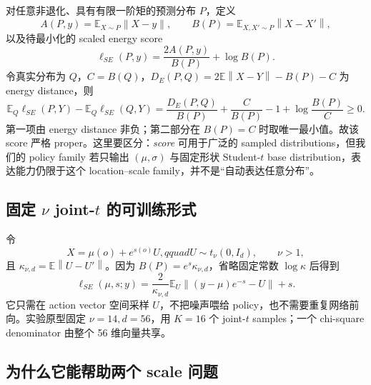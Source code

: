 \documentclass[10pt]{article}
\newcommand{\E}{\mathbb{E}}
\newcommand{\norm}[1]{\left\lVert#1\right\rVert}
\begin{document}
对任意非退化、具有有限一阶矩的预测分布 $P$，定义
\begin{equation}
 A(P,y)=\E_{X\sim P}\norm{X-y},\qquad
 B(P)=\E_{X,X'\sim P}\norm{X-X'},
\end{equation}
以及待最小化的 scaled energy score
\begin{equation}
 \ell_{SE}(P,y)=\frac{2A(P,y)}{B(P)}+\log B(P).
 \label{eq:scaled-energy-general}
\end{equation}
令真实分布为 $Q$，$C=B(Q)$，$D_E(P,Q)=2\E\norm{X-Y}-B(P)-C$ 为 energy distance，则
\begin{equation}
 \E_Q\ell_{SE}(P,Y)-\E_Q\ell_{SE}(Q,Y)
 =\frac{D_E(P,Q)}{B(P)}+\frac{C}{B(P)}-1+\log\frac{B(P)}{C}\ge0.
 \label{eq:propriety}
\end{equation}
第一项由 energy distance 非负；第二部分在 $B(P)=C$ 时取唯一最小值。故该 score 严格 proper。这里要区分：\emph{score} 可用于广泛的 sampled distributions，但我们的 policy family 若只输出 $(\mu,\sigma)$ 与固定形状 Student-$t$ base distribution，表达能力仍限于这个 location--scale family，并不是“自动表达任意分布”。

\subsection{固定 $\nu$ joint-$t$ 的可训练形式}

令
\begin{equation}
 X=\mu(o)+e^{s(o)}U,qquad U\sim t_\nu(0,I_d),\qquad \nu>1,
\end{equation}
且 $\kappa_{\nu,d}=\E\norm{U-U'}$。因为 $B(P)=e^s\kappa_{\nu,d}$，省略固定常数 $\log\kappa$ 后得到
\begin{equation}
 \ell_{SE}(\mu,s;y)
 =\frac{2}{\kappa_{\nu,d}}\E_U
 \left\| (y-\mu)e^{-s}-U\right\|+s.
 \label{eq:scaled-energy-t}
\end{equation}
它只需在 action vector 空间采样 $U$，不把噪声喂给 policy，也不需要重复网络前向。实验原型固定 $\nu=14,d=56$，用 $K=16$ 个 joint-$t$ samples；一个 chi-square denominator 由整个 56 维向量共享。

\subsection{为什么它能帮助两个 scale 问题}
\end{document}
